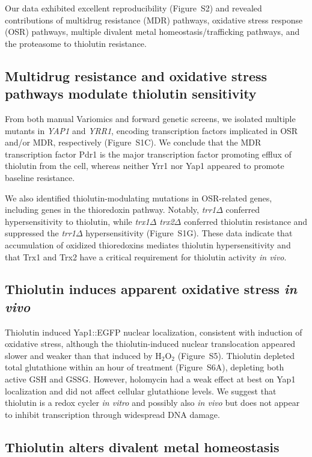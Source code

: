 \documentclass[11pt]{article}
\begin{document}
Our data exhibited excellent reproducibility (Figure~S2) and revealed contributions of multidrug resistance (MDR) pathways, oxidative stress response (OSR) pathways, multiple divalent metal homeostasis/trafficking pathways, and the proteasome to thiolutin resistance.

\subsection{Multidrug resistance and oxidative stress pathways modulate thiolutin sensitivity}

From both manual Variomics and forward genetic screens, we isolated multiple mutants in \textit{YAP1} and \textit{YRR1}, encoding transcription factors implicated in OSR and/or MDR, respectively (Figure~S1C). We conclude that the MDR transcription factor Pdr1 is the major transcription factor promoting efflux of thiolutin from the cell, whereas neither Yrr1 nor Yap1 appeared to promote baseline resistance.

We also identified thiolutin-modulating mutations in OSR-related genes, including genes in the thioredoxin pathway. Notably, \textit{trr1$\Delta$} conferred hypersensitivity to thiolutin, while \textit{trx1$\Delta$ trx2$\Delta$} conferred thiolutin resistance and suppressed the \textit{trr1$\Delta$} hypersensitivity (Figure~S1G). These data indicate that accumulation of oxidized thioredoxins mediates thiolutin hypersensitivity and that Trx1 and Trx2 have a critical requirement for thiolutin activity \textit{in vivo}.

\subsection{Thiolutin induces apparent oxidative stress \textit{in vivo}}

Thiolutin induced Yap1::EGFP nuclear localization, consistent with induction of oxidative stress, although the thiolutin-induced nuclear translocation appeared slower and weaker than that induced by H$_2$O$_2$ (Figure~S5). Thiolutin depleted total glutathione within an hour of treatment (Figure~S6A), depleting both active GSH and GSSG. However, holomycin had a weak effect at best on Yap1 localization and did not affect cellular glutathione levels. We suggest that thiolutin is a redox cycler \textit{in vitro} and possibly also \textit{in vivo} but does not appear to inhibit transcription through widespread DNA damage.

\subsection{Thiolutin alters divalent metal homeostasis}
\end{document}
